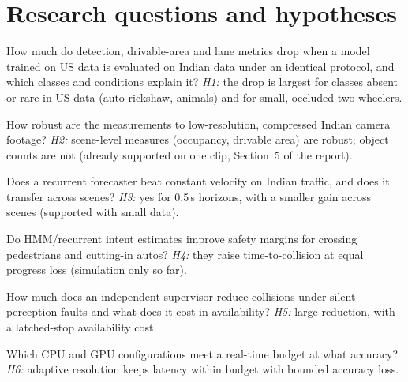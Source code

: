 \documentclass[11pt,a4paper]{article}
\begin{document}
\section{Research questions and hypotheses}
\begin{description}[leftmargin=1.5em]
\item[RQ1 Domain gap.] How much do detection, drivable-area and lane metrics drop when a model trained on US data is evaluated on Indian data under an identical protocol, and which classes and conditions explain it? \emph{H1:} the drop is largest for classes absent or rare in US data (auto-rickshaw, animals) and for small, occluded two-wheelers.
\item[RQ2 Quality sensitivity.] How robust are the measurements to low-resolution, compressed Indian camera footage? \emph{H2:} scene-level measures (occupancy, drivable area) are robust; object counts are not (already supported on one clip, Section~5 of the report).
\item[RQ3 Prediction.] Does a recurrent forecaster beat constant velocity on Indian traffic, and does it transfer across scenes? \emph{H3:} yes for 0.5\,s horizons, with a smaller gain across scenes (supported with small data).
\item[RQ4 Intent.] Do HMM/recurrent intent estimates improve safety margins for crossing pedestrians and cutting-in autos? \emph{H4:} they raise time-to-collision at equal progress loss (simulation only so far).
\item[RQ5 Safety architecture.] How much does an independent supervisor reduce collisions under silent perception faults and what does it cost in availability? \emph{H5:} large reduction, with a latched-stop availability cost.
\item[RQ6 Efficiency.] Which CPU and GPU configurations meet a real-time budget at what accuracy? \emph{H6:} adaptive resolution keeps latency within budget with bounded accuracy loss.
\end{description}
\end{document}
